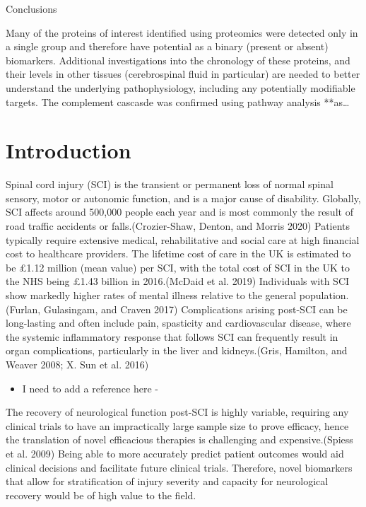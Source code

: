\documentclass[9pt,lineno]{elife}
\providecommand{\tightlist}{%
  \setlength{\itemsep}{0pt}\setlength{\parskip}{0pt}}
\begin{document}
Conclusions

Many of the proteins of interest identified using proteomics were detected only in a single group and therefore have potential as a binary (present or absent) biomarkers. Additional investigations into the chronology of these proteins, and their levels in other tissues (cerebrospinal fluid in particular) are needed to better understand the underlying pathophysiology, including any potentially modifiable targets. The complement cascasde was confirmed using pathway analysis **as\ldots{}

\hypertarget{introduction}{%
\section{Introduction}\label{introduction}}

Spinal cord injury (SCI) is the transient or permanent loss of normal spinal sensory, motor or autonomic function, and is a major cause of disability. Globally, SCI affects around 500,000 people each year and is most commonly the result of road traffic accidents or falls.(Crozier-Shaw, Denton, and Morris 2020)
Patients typically require extensive medical, rehabilitative and social care at high financial cost to healthcare providers. The lifetime cost of care in the UK is estimated to be £1.12 million (mean value) per SCI, with the total cost of SCI in the UK to the NHS being £1.43 billion in 2016.(McDaid et al. 2019)
Individuals with SCI show markedly higher rates of mental illness relative to the general population.(Furlan, Gulasingam, and Craven 2017)
Complications arising post-SCI can be long-lasting and often include pain, spasticity and cardiovascular disease, where the systemic inflammatory response that follows SCI can frequently result in organ complications, particularly in the liver and kidneys.(Gris, Hamilton, and Weaver 2008; X. Sun et al. 2016)

\begin{itemize}
\tightlist
\item
  I need to add a reference here -
\end{itemize}

The recovery of neurological function post-SCI is highly variable, requiring any clinical trials to have an impractically large sample size to prove efficacy, hence the translation of novel efficacious therapies is challenging and expensive.(Spiess et al. 2009)
Being able to more accurately predict patient outcomes would aid clinical decisions and facilitate future clinical trials. Therefore, novel biomarkers that allow for stratification of injury severity and capacity for neurological recovery would be of high value to the field.
\end{document}

